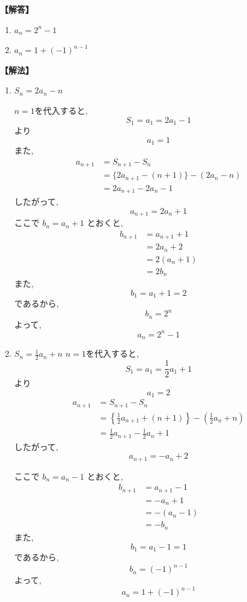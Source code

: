     \noindent\textbf{【解答】}
    \begin{enumerate}[label=(\arabic*),parsep=3pt]
      \item $\displaystyle a_n=2^n-1$
      \item $\displaystyle a_n=1+(-1)^{n-1}$
    \end{enumerate}

    \noindent\textbf{【解法】}
    \begin{enumerate}[label=(\arabic*),parsep=3pt]
    \item $\displaystyle S_n=2a_n-n$

        $n=1$を代入すると,
        \[
          S_1=a_1=2a_1-1
        \]
        より
        \[
          a_1=1
        \]
        また,
        \begin{align*}
          a_{n+1}
            &=S_{n+1}-S_n\\
            &=\{2a_{n+1}-(n+1)\}-(2a_n-n)\\
            &=2a_{n+1}-2a_n-1
        \end{align*}
        したがって,
        \[
          a_{n+1}=2a_n+1
        \]
        ここで $b_n=a_n+1$ とおくと,
        \begin{align*}
          b_{n+1}
            &=a_{n+1}+1\\
            &=2a_n+2\\
            &=2(a_n+1)\\
            &=2b_n
        \end{align*}
        また,
        \[
          b_1=a_1+1=2
        \]
        であるから,
        \[
          b_n=2^n
        \]
        よって,
        \[
          a_n=2^n-1
        \]
    \item $\displaystyle S_n=\frac12a_n+n$
        $n=1$を代入すると,
        \[
          S_1=a_1=\frac12a_1+1
        \]
        より
        \[
          a_1=2
        \]
        \begin{align*}
          a_{n+1}
            &=S_{n+1}-S_n\\
            &=\left\{\frac12a_{n+1}+(n+1)\right\}-\left(\frac12a_n+n\right)\\
            &=\frac12a_{n+1}-\frac12a_n+1
        \end{align*}
        したがって,
        \[
          a_{n+1}=-a_n+2
        \]

        ここで $b_n=a_n-1$ とおくと,
        \begin{align*}
          b_{n+1}
            &=a_{n+1}-1\\
            &=-a_n+1\\
            &=-(a_n-1)\\
            &=-b_n
        \end{align*}
        また,
        \[
          b_1=a_1-1=1
        \]
        であるから,
        \[
          b_n=(-1)^{n-1}
        \]
        よって,
        \[
          a_n=1+(-1)^{n-1}
        \]

    \end{enumerate}

